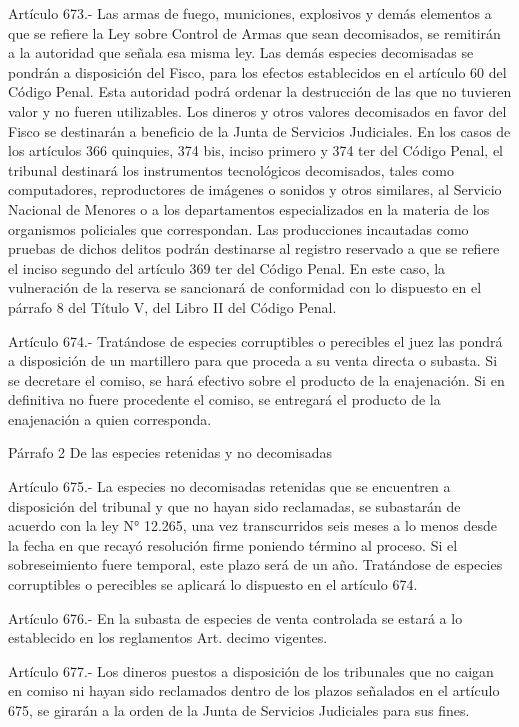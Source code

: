     Artículo 673.- Las armas de fuego, municiones, explosivos y demás elementos a que se refiere la Ley sobre Control de Armas que sean decomisados, se remitirán a la autoridad que señala esa misma ley.
    Las demás especies decomisadas se pondrán a disposición del Fisco, para los efectos establecidos en el artículo 60 del Código Penal. Esta autoridad podrá ordenar la destrucción de las que no tuvieren valor y no fueren utilizables.
    Los dineros y otros valores decomisados en favor del Fisco se destinarán a beneficio de la Junta de Servicios Judiciales.
    En los casos de los artículos 366 quinquies, 374 bis, inciso primero y 374 ter del Código Penal, el tribunal destinará los instrumentos tecnológicos decomisados, tales como computadores, reproductores de imágenes o sonidos y otros similares, al Servicio Nacional de Menores o a los departamentos especializados en la materia de los organismos policiales que correspondan. Las producciones incautadas como pruebas de dichos delitos podrán destinarse al registro reservado a que se refiere el inciso segundo del artículo 369 ter del Código Penal. En este caso, la vulneración de la reserva se sancionará de conformidad con lo dispuesto en el párrafo 8 del Título V, del Libro II del Código Penal.

    Artículo 674.- Tratándose de especies corruptibles o perecibles el juez las pondrá a disposición de un martillero para que proceda a su venta directa o subasta.
    Si se decretare el comiso, se hará efectivo sobre el producto de la enajenación.
    Si en definitiva no fuere procedente el comiso, se entregará el producto de la enajenación a quien corresponda.

  Párrafo 2
  De las especies retenidas y no decomisadas


    Artículo 675.- La especies no decomisadas retenidas que se encuentren a disposición del tribunal y que no hayan sido reclamadas, se subastarán de acuerdo con la ley N° 12.265, una vez transcurridos seis meses a lo menos desde la fecha en que recayó resolución firme poniendo término al proceso. Si el sobreseimiento fuere temporal, este plazo será de un año.
    Tratándose de especies corruptibles o perecibles se aplicará lo dispuesto en el artículo 674.

    Artículo 676.- En la subasta de especies de venta controlada se estará a lo establecido en los reglamentos Art. decimo vigentes.


    Artículo 677.- Los dineros puestos a disposición de los tribunales que no caigan en comiso ni hayan sido reclamados dentro de los plazos señalados en el artículo 675, se girarán a la orden de la Junta de Servicios Judiciales para sus fines.

